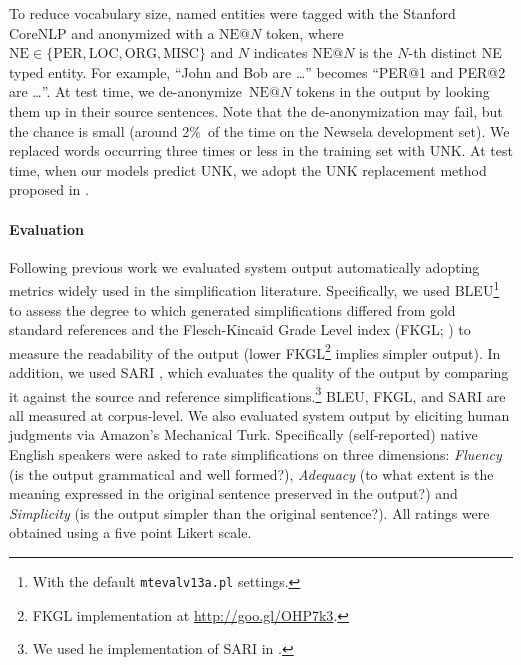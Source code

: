 \documentclass[11pt,letterpaper]{article}
\begin{document}
To reduce vocabulary size, named entities were tagged with the
Stanford CoreNLP \cite{manning-EtAl:2014:P14-5} and anonymized with a
$\text{NE}@N$ token, where
$\text{NE} \in \{\text{PER}, \text{LOC}, \text{ORG}, \text{MISC} \}$
and $N$ indicates $\text{NE}@N$ is the $N$-th distinct NE typed
entity. For example, ``John and Bob are \dots'' becomes ``PER@1 and
PER@2 are \dots''. At test time, we de-anonymize~$\text{NE}@N$ tokens
in the output by looking them up in their source sentences. Note that
the de-anonymization may fail, but the chance is small (around 2\%~of
the time on the Newsela development set). We replaced words occurring
three times or less in the training set with UNK. At test time, when
our models predict UNK, we adopt the UNK replacement method proposed
in \citet{jean2015montreal}.


\paragraph{Evaluation}
Following previous work \cite{woodsend-lapata:2011:EMNLP,Xu_TACL16} we
evaluated system output automatically adopting metrics widely used in
the simplification literature. Specifically, we used
BLEU\footnote{With the default {\tt mtevalv13a.pl} settings.}
\cite{papineni:2002} to assess the degree to which generated
simplifications differed from gold standard references and the
Flesch-Kincaid Grade Level index (FKGL; \citealt{kincaid:1975}) to
measure the readability of the output (lower FKGL\footnote{FKGL implementation at {\small \url{http://goo.gl/OHP7k3}}.} implies
simpler output). In addition, we used SARI \cite{Xu_TACL16}, which
evaluates the quality of the output by comparing it against the source
and reference simplifications.\footnote{We used he implementation of
  SARI in .}  BLEU, FKGL, and SARI are all measured
at corpus-level.
We also evaluated system output by eliciting human judgments via
Amazon's Mechanical Turk. Specifically (self-reported) native English
speakers were asked to rate simplifications on three dimensions:
\emph{Fluency} (is the output grammatical and well formed?),
\emph{Adequacy} (to what extent is the meaning expressed in the
original sentence preserved in the output?) and \emph{Simplicity} (is
the output simpler than the original sentence?). All ratings were
obtained using a five point Likert scale.
\end{document}
